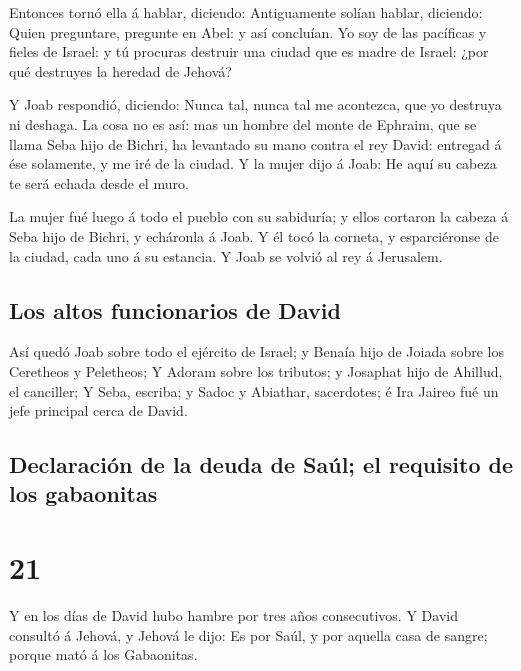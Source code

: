  Entonces tornó ella á hablar, diciendo: Antiguamente
solían hablar, diciendo: Quien preguntare, pregunte en Abel: y así
concluían.  Yo soy de las pacíficas y fieles de Israel: y
tú procuras destruir una ciudad que es madre de Israel: ¿por qué
destruyes la heredad de Jehová?

 Y Joab respondió, diciendo: Nunca tal, nunca tal me
acontezca, que yo destruya ni deshaga.  La cosa no es
así: mas un hombre del monte de Ephraim, que se llama Seba hijo de
Bichri, ha levantado su mano contra el rey David: entregad á ése
solamente, y me iré de la ciudad. Y la mujer dijo á Joab: He aquí su
cabeza te será echada desde el muro.

 La mujer fué luego á todo el pueblo con su sabiduría; y
ellos cortaron la cabeza á Seba hijo de Bichri, y echáronla á Joab. Y él
tocó la corneta, y esparciéronse de la ciudad, cada uno á su estancia. Y
Joab se volvió al rey á Jerusalem.

\hypertarget{los-altos-funcionarios-de-david}{%
\subsection{Los altos funcionarios de
David}\label{los-altos-funcionarios-de-david}}

 Así quedó Joab sobre todo el ejército de Israel; y
Benaía hijo de Joiada sobre los Ceretheos y Peletheos;  Y
Adoram sobre los tributos; y Josaphat hijo de Ahillud, el canciller;
 Y Seba, escriba; y Sadoc y Abiathar, sacerdotes; é Ira
Jaireo fué un jefe principal cerca de David. 

\hypertarget{declaraciuxf3n-de-la-deuda-de-sauxfal-el-requisito-de-los-gabaonitas}{%
\subsection{Declaración de la deuda de Saúl; el requisito de los
gabaonitas}\label{declaraciuxf3n-de-la-deuda-de-sauxfal-el-requisito-de-los-gabaonitas}}

\hypertarget{section-20}{%
\section{21}\label{section-20}}

 Y en los días de David hubo hambre por tres años
consecutivos. Y David consultó á Jehová, y Jehová le dijo: Es por Saúl,
y por aquella casa de sangre; porque mató á los Gabaonitas.

